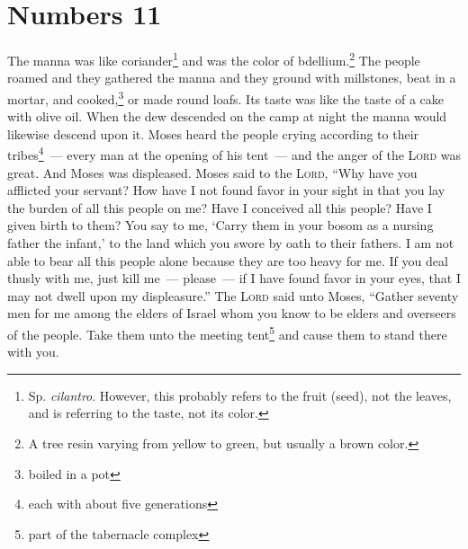 \section{Numbers 11}\label{Numbers 11}
\begin{enumerate}
     The manna was like coriander\footnote{Sp. \emph{cilantro}. However, this probably refers to the fruit (seed), not the leaves, and is referring to the taste, not its color.} and was the color of bdellium.\footnote{A tree resin varying from yellow to green, but usually a brown color.}%
     The people roamed and they gathered the manna and they ground with millstones, beat in a mortar, and cooked,\footnote{boiled in a pot} or made round loafs. Its taste was like the taste of a cake with olive oil.%
     When the dew descended on the camp at night the manna would likewise descend upon it.%
     Moses heard the people crying according to their tribes\footnote{each with about five generations}~--- every man at the opening of his tent~--- and the anger of the \textsc{Lord} was great. And Moses was displeased.%
     Moses said to the \textsc{Lord}, ``Why have you afflicted your servant? How have I not found favor in your sight in that you lay the burden of all this people on me?%
     Have I conceived all this people? Have I given birth to them? You say to me, `Carry them in your bosom as a nursing father the infant,' to the land which you swore by oath to their fathers.%
     I am not able to bear all this people alone because they are too heavy for me.%
     If you deal thusly with me, just kill me~--- please~--- if I have found favor in your eyes, that I may not dwell upon my displeasure.''%
     The \textsc{Lord} said unto Moses, ``Gather seventy men for me among the elders of Israel whom you know to be elders and overseers of the people. Take them unto the meeting tent\footnote{part of the tabernacle complex} and cause them to stand there with you.%

\end{enumerate}

